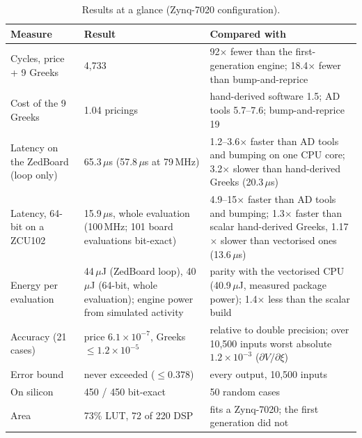 \documentclass[11pt,a4paper]{article}
\begin{document}
\begin{table}[H]
\centering
\small
\begin{tabularx}{\textwidth}{@{}l Y Y@{}}
\toprule
\textbf{Measure} & \textbf{Result} & \textbf{Compared with}\\
\midrule
Cycles, price + 9 Greeks & 4,733 & 92$\times$ fewer than the first-generation engine; 18.4$\times$ fewer than bump-and-reprice\\
Cost of the 9 Greeks & 1.04 pricings & hand-derived software 1.5; AD tools 5.7--7.6; bump-and-reprice 19\\
Latency on the ZedBoard (loop only) & 65.3\,$\mu$s (57.8\,$\mu$s at 79\,MHz) & 1.2--3.6$\times$ faster than AD tools and bumping on one CPU core; 3.2$\times$ slower than hand-derived Greeks (20.3\,$\mu$s)\\
Latency, 64-bit on a ZCU102 & 15.9\,$\mu$s, whole evaluation (100\,MHz; 101 board evaluations bit-exact) & 4.9--15$\times$ faster than AD tools and bumping; 1.3$\times$ faster than scalar hand-derived Greeks, 1.17$\times$ slower than vectorised ones (13.6\,$\mu$s)\\
Energy per evaluation & 44\,$\mu$J (ZedBoard loop), 40\,$\mu$J (64-bit, whole evaluation); engine power from simulated activity & parity with the vectorised CPU (40.9\,$\mu$J, measured package power); 1.4$\times$ less than the scalar build\\
Accuracy (21 cases) & price $6.1\times10^{-7}$, Greeks $\le 1.2\times10^{-5}$ & relative to double precision; over 10,500 inputs worst absolute $1.2\times10^{-3}$ ($\partial V/\partial\xi$)\\
Error bound & never exceeded ($\le 0.378$) & every output, 10,500 inputs\\
On silicon & 450 / 450 bit-exact & 50 random cases\\
Area & 73\% LUT, 72 of 220 DSP & fits a Zynq-7020; the first generation did not\\
\bottomrule
\end{tabularx}
\caption{Results at a glance (Zynq-7020 configuration).}
\label{tab:glance}
\end{table}
\end{document}

